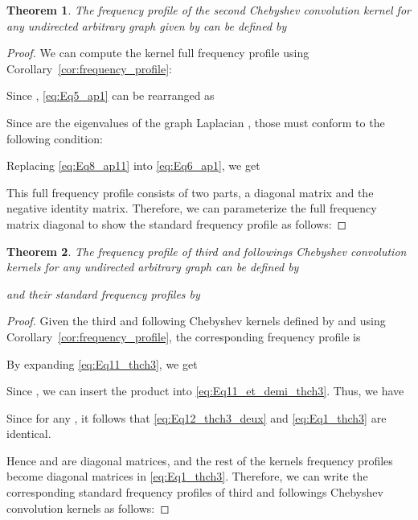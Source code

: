 \documentclass{article}
\newtheorem{theorem}{Theorem}
\begin{document}
\begin{theorem}
  \label{Th:thch2}
The frequency profile of the second Chebyshev convolution kernel for any undirected arbitrary graph given by  can be defined by

\end{theorem}

\begin{proof}
We can compute the  kernel full frequency profile using Corollary~\ref{cor:frequency_profile}:

Since , \eqref{eq:Eq5_ap1} can be rearranged as


Since  are the eigenvalues of the graph Laplacian , those must conform to the following condition:

Replacing \eqref{eq:Eq8_ap11} into \eqref{eq:Eq6_ap1}, we get



This full frequency profile consists of two parts, a diagonal matrix and the negative identity matrix. Therefore, we can parameterize the full frequency matrix diagonal to show the standard frequency profile as follows:

\end{proof}

\begin{theorem}
  \label{Th:thch3}
The frequency profile of third and followings Chebyshev convolution kernels for any undirected arbitrary graph can be defined by

and their standard frequency profiles by


\end{theorem}

\begin{proof}
Given the third and following Chebyshev kernels defined by  and  using Corollary~\ref{cor:frequency_profile}, the corresponding frequency profile is

By expanding \eqref{eq:Eq11_thch3}, we get

Since , we can insert the product  into \eqref{eq:Eq11_et_demi_thch3}. Thus, we have

Since  for any , it follows that \eqref{eq:Eq12_thch3_deux} and \eqref{eq:Eq1_thch3} are identical.

Hence  and  are diagonal matrices, and the rest of the kernels frequency profiles become diagonal matrices in \eqref{eq:Eq1_thch3}. Therefore, we can write the corresponding standard frequency profiles of third and followings Chebyshev convolution kernels as follows:


\end{proof}
\end{document}
